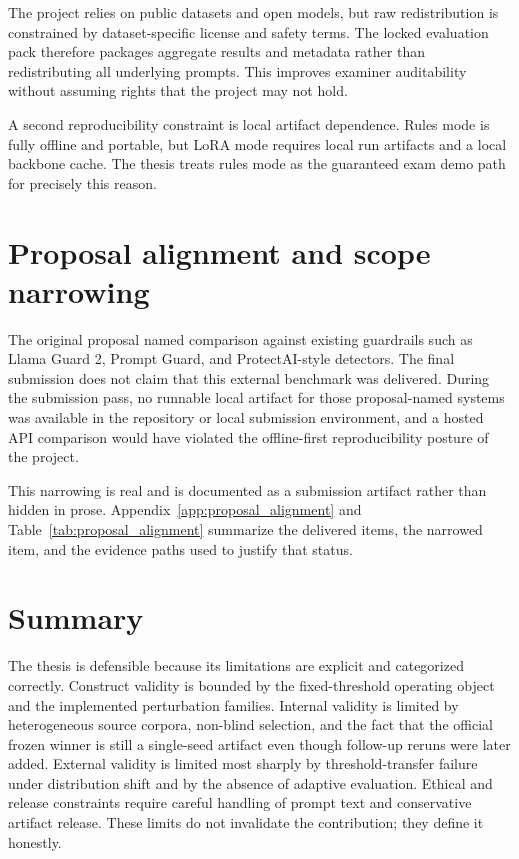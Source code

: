 The project relies on public datasets and open models, but raw redistribution is constrained by dataset-specific license and safety terms. The locked evaluation pack therefore packages aggregate results and metadata rather than redistributing all underlying prompts. This improves examiner auditability without assuming rights that the project may not hold.

A second reproducibility constraint is local artifact dependence. Rules mode is fully offline and portable, but LoRA mode requires local run artifacts and a local backbone cache. The thesis treats rules mode as the guaranteed exam demo path for precisely this reason.

\section{Proposal alignment and scope narrowing}

The original proposal named comparison against existing guardrails such as Llama Guard 2, Prompt Guard, and ProtectAI-style detectors. The final submission does not claim that this external benchmark was delivered. During the submission pass, no runnable local artifact for those proposal-named systems was available in the repository or local submission environment, and a hosted API comparison would have violated the offline-first reproducibility posture of the project.

This narrowing is real and is documented as a submission artifact rather than hidden in prose. Appendix~\ref{app:proposal_alignment} and Table~\ref{tab:proposal_alignment} summarize the delivered items, the narrowed item, and the evidence paths used to justify that status.

\section{Summary}

The thesis is defensible because its limitations are explicit and categorized correctly. Construct validity is bounded by the fixed-threshold operating object and the implemented perturbation families. Internal validity is limited by heterogeneous source corpora, non-blind selection, and the fact that the official frozen winner is still a single-seed artifact even though follow-up reruns were later added. External validity is limited most sharply by threshold-transfer failure under distribution shift and by the absence of adaptive evaluation. Ethical and release constraints require careful handling of prompt text and conservative artifact release. These limits do not invalidate the contribution; they define it honestly.
